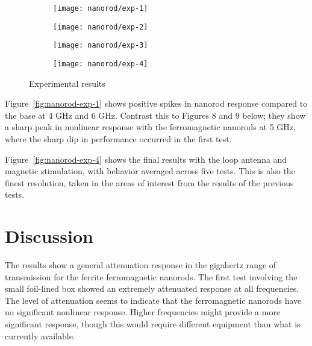 \begin{figure}[h!]
    \centering
    \begin{subfigure}{0.45\textwidth}
        \centering
        \texttt{[image: nanorod/exp-1]}
        \caption[]{}
        \label{nanorod-exp-1}
    \end{subfigure}
        \begin{subfigure}{0.45\textwidth}
        \centering
        \texttt{[image: nanorod/exp-2]}
        \caption[]{}
        \label{nanorod-exp-2}
    \end{subfigure}
        \begin{subfigure}{0.45\textwidth}
        \centering
        \texttt{[image: nanorod/exp-3]}
        \caption[]{}
        \label{nanorod-exp-3}
    \end{subfigure}
        \begin{subfigure}{0.45\textwidth}
        \centering
        \texttt{[image: nanorod/exp-4]}
        \caption[]{}
        \label{nanorod-exp-4}
    \end{subfigure}
    \caption[Ferromagnetic nanorod experimental results]{Experimental results}
    \label{fig:nanorod-results}
\end{figure}

Figure~\ref{fig:nanorod-exp-1} shows positive spikes in nanorod response compared to the base at 4 GHz and 6 GHz. Contrast this to Figures 8 and 9 below; they show a sharp peak in nonlinear response with the ferromagnetic nanorods at 5 GHz, where the sharp dip in performance occurred in the first test.

Figure~\ref{fig:nanorod-exp-4} shows the final results with the loop antenna and magnetic stimulation, with behavior averaged across five tests. This is also the finest resolution, taken in the areas of interest from the results of the previous tests.

\section{Discussion}
\label{sec:nanorod-discussion}

The results show a general attenuation response in the gigahertz range of transmission for the ferrite ferromagnetic nanorods. The first test involving the small foil-lined box showed an extremely attenuated response at all frequencies. The level of attenuation seems to indicate that the ferromagnetic nanorods have no significant nonlinear response. Higher frequencies might provide a more significant response, though this would require different equipment than what is currently available.

